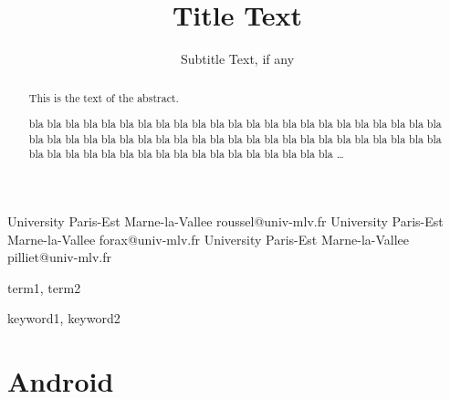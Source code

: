 \documentclass{sigplanconf}
\begin{document}
\setlength{\pdfpageheight}{\paperheight}
\setlength{\pdfpagewidth}{\paperwidth}






\title{Title Text}
\subtitle{Subtitle Text, if any}

           {University Paris-Est Marne-la-Vallee}
           {roussel@univ-mlv.fr}
           {University Paris-Est Marne-la-Vallee}
           {forax@univ-mlv.fr}
           {University Paris-Est Marne-la-Vallee}
           {pilliet@univ-mlv.fr}

\maketitle

\begin{abstract}
This is the text of the abstract.

bla bla bla bla bla bla bla bla bla
bla bla bla bla bla bla bla bla bla
bla bla bla bla bla bla bla bla bla
bla bla bla bla bla bla bla bla bla
bla bla bla bla bla bla bla bla bla
bla bla bla bla bla bla bla bla bla
bla bla bla bla bla bla bla bla bla
\dots
\end{abstract}


\terms
term1, term2

\keywords
keyword1, keyword2

  \section{Android}
\end{document}
